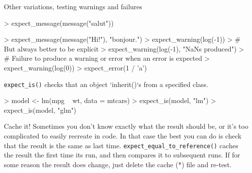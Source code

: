 \documentclass[12pt,handout]{beamer}
\begin{document}
\begin{frame}[fragile]{Other variations, testing warnings and failures}
\begin{Schunk}
\begin{Sinput}
>     expect_message(message("salut"))
\end{Sinput}
\end{Schunk}
    
%


\begin{Schunk}
\begin{Sinput}
>     expect_message(message("Hi!"), "bonjour.")    
>     expect_warning(log(-1))
>     # But always better to be explicit
>     expect_warning(log(-1), "NaNs produced")
>     # Failure to produce a warning or error when an error is expected
>     expect_warning(log(0))
>     expect_error(1 / 'a') 
\end{Sinput}
\end{Schunk}
\end{frame}


\begin{frame}[fragile]
\texttt{expect\_is()} checks that an object `inherit()`s from a specified class.

\begin{Schunk}
\begin{Sinput}
>     model <- lm(mpg ~ wt, data = mtcars)
>     expect_is(model, "lm")
>     expect_is(model, "glm")
\end{Sinput}
\end{Schunk}

\end{frame}


\begin{frame}[fragile]{Cache it!}
Sometimes you don't know exactly what the result should be, or it's too 
    complicated to easily recreate in code. In that case the best you can do is 
    check that the result is the same as last time. \texttt{expect\_equal\_to\_reference()} 
    caches the result the first time its run, and then compares it to subsequent 
    runs. If for some reason the result does change, just delete the cache (*)
    file and re-test.

\end{frame}
\end{document}
